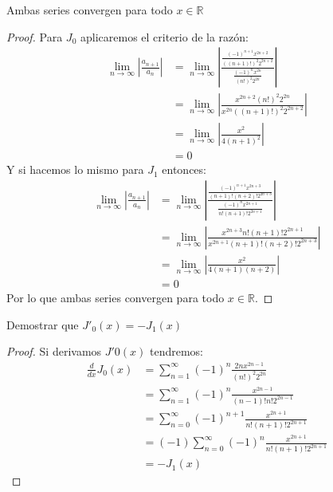\documentclass[../main.tex]{subfiles}
\begin{document}
\question Ambas series convergen para todo $x\in \mathbb{R}$
\begin{proof}
    Para $J_0$ aplicaremos el criterio de la razón:
    \begin{align*}
        \lim_{n \to \infty} \left|\frac{a_{n+1}}{a_n}\right| &= \lim_{n \to \infty} \left|\frac{\frac{(-1)^{n+1} x^{2n+2}}{((n+1)!)^2 2^{2n+2}}}{\frac{(-1)^nx^{2n}}{(n!)^2 2^{2n}}}\right|\\
        &= \lim_{n \to \infty} \left|\frac{x^{2n+2} (n!)^2 2^{2n}}{x^{2n} ((n+1)!)^2 2^{2n+2}}\right|\\
        &= \lim_{n \to \infty} \left|\frac{x^2}{4(n+1)^2 }\right|\\
        &= 0
    \end{align*}
    Y si hacemos lo mismo para $J_1$ entonces:
    \begin{align*}
        \lim_{n \to \infty} \left|\frac{a_{n+1}}{a_n}\right| &= \lim_{n \to \infty} \left|\frac{\frac{(-1)^{n+1}x^{2n+3}}{(n+1)! (n+2)! 2^{2n+3}}}{\frac{(-1)^nx^{2n+1}}{n! (n+1)! 2^{2n+1}}}\right|\\
        &= \lim_{n \to \infty} \left|\frac{x^{2n+3} n! (n+1)! 2^{2n+1}}{x^{2n+1} (n+1)! (n+2)! 2^{2n+3}}\right|\\
        &= \lim_{n \to \infty} \left|\frac{x^2}{4(n+1)(n+2)}\right|\\
        &= 0
    \end{align*}
    Por lo que ambas series convergen para todo $x \in \mathbb{R}$.
\end{proof}

\question Demostrar que $J'_0(x) = -J_1(x)$
\begin{proof}
    Si derivamos $J'0(x)$ tendremos:
    \begin{align*}
        \frac{d}{dx} J_0(x) &= \sum_{n = 1}^\infty (-1)^n \frac{2n x^{2n-1}}{(n!)^2 2^{2n}}\\
        &= \sum_{n = 1}^\infty (-1)^n \frac{x^{2n-1}}{(n-1)! n! 2^{2n-1}}\\
        &= \sum_{n = 0}^\infty (-1)^{n+1} \frac{x^{2n+1}}{n! (n+1)! 2^{2n+1}}\\
        &= (-1) \sum_{n = 0}^\infty (-1)^{n} \frac{x^{2n+1}}{n! (n+1)! 2^{2n+1}}\\
        &= - J_1(x)
    \end{align*}
\end{proof}
\end{document}
